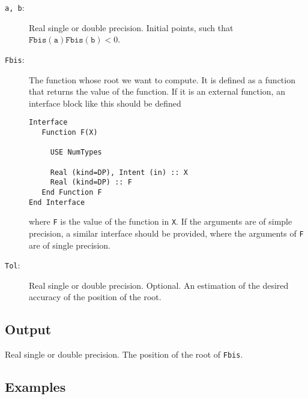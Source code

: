\begin{description}
\item[\texttt{a, b}:] Real single or double precision. Initial points,
  such that $\mathtt{Fbis(a)Fbis(b)} < 0$.
\item[\texttt{Fbis}:] The function whose root we want to compute. It
  is defined as a function that returns the value of the function. If
  it is an external function, an interface block like this should be
  defined 
\begin{verbatim}
Interface
   Function F(X)

     USE NumTypes

     Real (kind=DP), Intent (in) :: X
     Real (kind=DP) :: F
   End Function F
End Interface
\end{verbatim}
where \texttt{F} is the value of the function in \texttt{X}. If the
arguments are of simple precision, a similar interface should be
provided, where the arguments of \texttt{F} are of single
precision. 
\item[\texttt{Tol}:] Real single or double precision. Optional. An
  estimation of the desired accuracy of the  position of the root.
\end{description}

\subsection{Output}

Real single or double precision. The position of the root of
\texttt{Fbis}.

\subsection{Examples}

